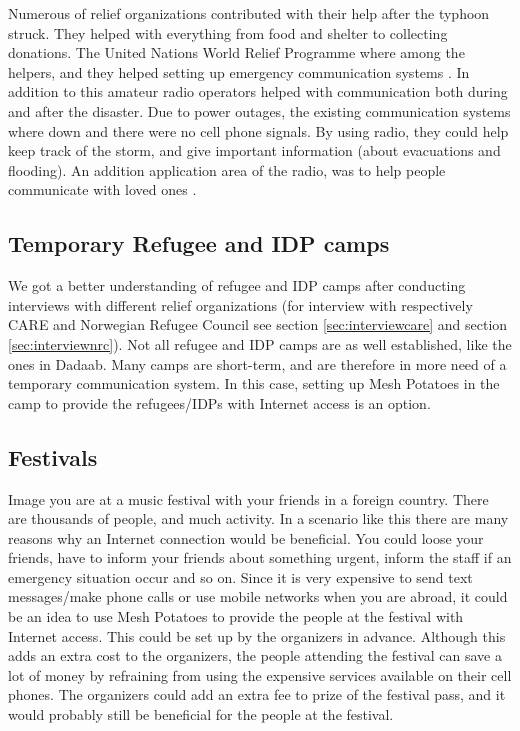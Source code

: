 Numerous of relief organizations contributed with their help after the typhoon struck. They helped with everything from food and shelter to collecting donations. The United Nations World Relief Programme where among the helpers, and they helped setting up emergency communication systems \cite{philippines}. In addition to this amateur radio operators helped with communication both during and after the disaster. Due to power outages, the existing communication systems where down and there were no cell phone signals. By using radio, they could help keep track of the storm, and give important information (about evacuations and flooding). An addition application area of the radio, was to help people communicate with loved ones \cite{philippinesradio}. 


\subsection{Temporary Refugee and IDP camps}
We got a better understanding of refugee and IDP camps after conducting interviews with different relief organizations (for interview with respectively CARE and Norwegian Refugee Council see section \ref{sec:interviewcare} and section \ref{sec:interviewnrc}). 
Not all refugee and IDP camps are as well established, like the ones in Dadaab. Many camps are short-term, and are therefore in more need of a temporary communication system. In this case, setting up Mesh Potatoes in the camp to provide the refugees/IDPs with Internet access is an option. 

\subsection{Festivals}
Image you are at a music festival with your friends in a foreign country. There are thousands of people, and much activity. In a scenario like this there are many reasons why an Internet connection would be beneficial. You could loose your friends, have to inform your friends about something urgent, inform the staff if an emergency situation occur and so on. Since it is very expensive to send text messages/make phone calls or use mobile networks when you are abroad, it could be an idea to use Mesh Potatoes to provide the people at the festival with Internet access. This could be set up by the organizers in advance. Although this adds an extra cost to the organizers, the people attending the festival can save a lot of money by refraining from using the expensive services available on their cell phones. The organizers could add an extra fee to prize of the festival pass, and it would probably still be beneficial for the people at the festival. 


